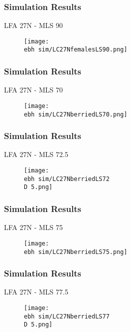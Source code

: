 \documentclass{beamer}
\newcommand{\ebh}{\string~/bio.data/bio.lobster/figures/LFA2733Framework2018/} %
\newcommand{\D}{.}
\begin{document}
\begin{frame}
\frametitle{Simulation Results}
LFA 27N - MLS 90
\begin{figure}
        \begin{center}
            \texttt{[image: \\ebh sim/LC27NfemalesLS90.png]}
        \end{center}
    \end{figure}
\end{frame}




\begin{frame}
\frametitle{Simulation Results}
LFA 27N - MLS 70
\begin{figure}
        \begin{center}
            \texttt{[image: \\ebh sim/LC27NberriedLS70.png]}
        \end{center}
    \end{figure}
\end{frame}


\begin{frame}
\frametitle{Simulation Results}
LFA 27N - MLS 72.5
\begin{figure}
        \begin{center}
            \texttt{[image: \\ebh sim/LC27NberriedLS72\\D 5.png]}
        \end{center}
    \end{figure}
\end{frame}


\begin{frame}
\frametitle{Simulation Results}
LFA 27N - MLS 75
\begin{figure}
        \begin{center}
            \texttt{[image: \\ebh sim/LC27NberriedLS75.png]}
        \end{center}
    \end{figure}
\end{frame}


\begin{frame}
\frametitle{Simulation Results}
LFA 27N - MLS 77.5
\begin{figure}
        \begin{center}
            \texttt{[image: \\ebh sim/LC27NberriedLS77\\D 5.png]}
        \end{center}
    \end{figure}
\end{frame}
\end{document}
